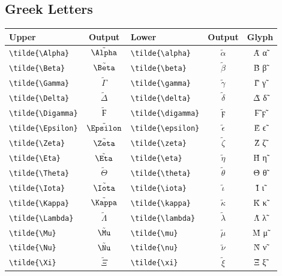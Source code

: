 \documentclass[12pt,a4paper]{article}
\begin{document}
\subsection*{Greek Letters}
\begin{longtable}{|l|c|l|c|c|}
\hline
\textbf{Upper}             & \textbf{Output}    & \textbf{Lower}             & \textbf{Output}       & \textbf{Glyph} \\
\hline
\verb|\tilde{\Alpha}|      & $\tilde{\Alpha}$   & \verb|\tilde{\alpha}|      & $\tilde{\alpha}$      & Α̃ α̃ \\
\verb|\tilde{\Beta}|       & $\tilde{\Beta}$    & \verb|\tilde{\beta}|       & $\tilde{\beta}$       & Β̃ β̃ \\
\verb|\tilde{\Gamma}|      & $\tilde{\Gamma}$   & \verb|\tilde{\gamma}|      & $\tilde{\gamma}$      & Γ̃ γ̃ \\
\verb|\tilde{\Delta}|      & $\tilde{\Delta}$   & \verb|\tilde{\delta}|      & $\tilde{\delta}$      & Δ̃ δ̃ \\
\verb|\tilde{\Digamma}|    & $\tilde{\Digamma}$ & \verb|\tilde{\digamma}|    & $\tilde{\digamma}$    & Ϝ̃ ϝ̃ \\
\verb|\tilde{\Epsilon}|    & $\tilde{\Epsilon}$ & \verb|\tilde{\epsilon}|    & $\tilde{\epsilon}$    & Ε̃ ϵ̃ \\
\verb|\tilde{\Zeta}|       & $\tilde{\Zeta}$    & \verb|\tilde{\zeta}|       & $\tilde{\zeta}$       & Ζ̃ ζ̃ \\
\verb|\tilde{\Eta}|        & $\tilde{\Eta}$     & \verb|\tilde{\eta}|        & $\tilde{\eta}$        & Η̃ η̃ \\
\verb|\tilde{\Theta}|      & $\tilde{\Theta}$   & \verb|\tilde{\theta}|      & $\tilde{\theta}$      & Θ̃ θ̃ \\
\verb|\tilde{\Iota}|       & $\tilde{\Iota}$    & \verb|\tilde{\iota}|       & $\tilde{\iota}$       & Ι̃ ι̃ \\
\verb|\tilde{\Kappa}|      & $\tilde{\Kappa}$   & \verb|\tilde{\kappa}|      & $\tilde{\kappa}$      & Κ̃ κ̃ \\
\verb|\tilde{\Lambda}|     & $\tilde{\Lambda}$  & \verb|\tilde{\lambda}|     & $\tilde{\lambda}$     & Λ̃ λ̃ \\
\verb|\tilde{\Mu}|         & $\tilde{\Mu}$      & \verb|\tilde{\mu}|         & $\tilde{\mu}$         & Μ̃ μ̃ \\
\verb|\tilde{\Nu}|         & $\tilde{\Nu}$      & \verb|\tilde{\nu}|         & $\tilde{\nu}$         & Ν̃ ν̃ \\
\verb|\tilde{\Xi}|         & $\tilde{\Xi}$      & \verb|\tilde{\xi}|         & $\tilde{\xi}$         & Ξ̃ ξ̃ \\

\end{longtable}
\end{document}
